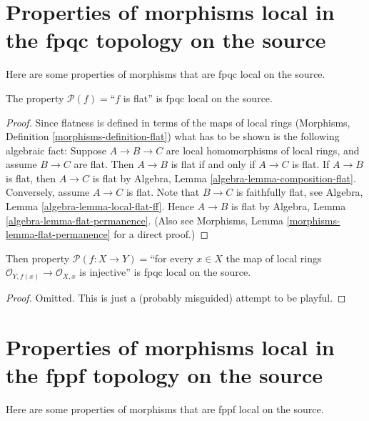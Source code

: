 \section{Properties of morphisms local in the fpqc topology on the source}
\label{section-fpqc-local-source}

\noindent
Here are some properties of morphisms that are fpqc local on the source.

\begin{lemma}
\label{lemma-flat-fpqc-local-source}
The property $\mathcal{P}(f)=$``$f$ is flat'' is fpqc local on the source.
\end{lemma}

\begin{proof}
Since flatness is defined in terms of the maps of local rings
(Morphisms, Definition \ref{morphisms-definition-flat})
what has to be shown is the following
algebraic fact: Suppose $A \to B \to C$ are local homomorphisms of local
rings, and assume $B \to C$ are flat. Then $A \to B$ is
flat if and only if $A \to C$ is flat.
If $A \to B$ is flat, then $A \to C$ is flat by
Algebra, Lemma \ref{algebra-lemma-composition-flat}.
Conversely, assume $A \to C$ is flat.
Note that $B \to C$ is faithfully
flat, see
Algebra, Lemma \ref{algebra-lemma-local-flat-ff}.
Hence $A \to B$ is flat by
Algebra, Lemma \ref{algebra-lemma-flat-permanence}.
(Also see Morphisms, Lemma \ref{morphisms-lemma-flat-permanence}
for a direct proof.)
\end{proof}

\begin{lemma}
\label{lemma-injective-local-rings-fpqc-local-source}
Then property
$\mathcal{P}(f : X \to Y)=$``for every $x \in X$ the map of local
rings $\mathcal{O}_{Y, f(x)} \to \mathcal{O}_{X, x}$ is injective''
is fpqc local on the source.
\end{lemma}

\begin{proof}
Omitted. This is just a (probably misguided) attempt to be playful.
\end{proof}





\section{Properties of morphisms local in the fppf topology on the source}
\label{section-fppf-local-source}

\noindent
Here are some properties of morphisms that are fppf local on the source.


